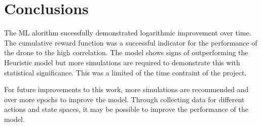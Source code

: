 \section{Conclusions}

The ML alorithm sucessfully demonstrated logarithmic improvement over time.
The cumulative reward function was a successful indicator for the performance of the drone to the high correlation.
The model shows signs of outperforming the Heuristic model but more simulations are required to demonstrate this with statistical significance.
This was a limited of the time contraint of the project.

For future improvements to this work, more simulations are recommended and over more epochs to improve the model.
Through collecting data for different actions and state spaces, it may be possible to improve the performance of the model.

